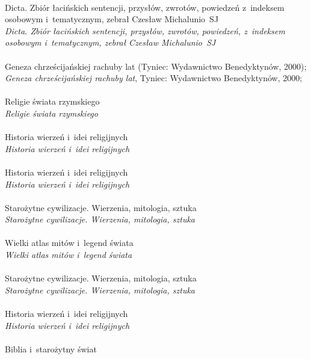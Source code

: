\documentclass[a4paper,11pt]{article}
\begin{document}
\noindent
{} \\
\Jest  Dicta. Zbiór łacińskich sentencji, przysłów, zwrotów, powiedzeń
z~indeksem osobowym i~tematycznym, zebrał Czesław Michalunio~SJ \\
\Powin \textit{Dicta. Zbiór łacińskich sentencji, przysłów, zwrotów,
  powiedzeń, z~indeksem osobowym i~tematycznym,
  zebrał Czesław Michalunio~SJ} \\
 \\
\Jest  Geneza chrześcijańskiej rachuby lat (Tyniec: Wydawnictwo
Benedyktynów, 2000); \\
\Powin \textit{Geneza chrześcijańskiej rachuby lat}, Tyniec: Wydawnictwo
Benedyktynów, 2000; \\
 \\
\Jest  Religie świata rzymskiego \\
\Powin \textit{Religie świata rzymskiego} \\
 \\
\Jest  Historia wierzeń i~idei religijnych \\
\Powin \textit{Historia wierzeń i~idei religijnych} \\
 \\
\Jest  Historia wierzeń i~idei religijnych \\
\Powin \textit{Historia wierzeń i~idei religijnych} \\
 \\
\Jest  Starożytne cywilizacje. Wierzenia, mitologia, sztuka \\
\Powin \textit{Starożytne cywilizacje. Wierzenia, mitologia, sztuka} \\
 \\
\Jest  Wielki atlas mitów i~legend świata \\
\Powin \textit{Wielki atlas mitów i~legend świata} \\
 \\
\Jest  Starożytne cywilizacje. Wierzenia, mitologia, sztuka \\
\Powin \textit{Starożytne cywilizacje. Wierzenia, mitologia, sztuka} \\
 \\
\Jest  Historia wierzeń i~idei religijnych \\
\Powin \textit{Historia wierzeń i~idei religijnych} \\
 \\
\Jest  Biblia i~starożytny świat \\
\end{document}
